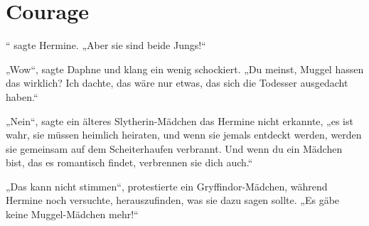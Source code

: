 \chapter{Courage}

“ sagte Hermine. „Aber sie sind beide Jungs!“

\hplettrineextrapara
„Wow“, sagte Daphne und klang ein wenig schockiert. „Du meinst, Muggel hassen das wirklich? Ich dachte, das wäre nur etwas, das sich die Todesser ausgedacht haben.“

„Nein“, sagte ein älteres Slytherin-Mädchen das Hermine nicht erkannte, „es ist wahr, sie müssen heimlich heiraten, und wenn sie jemals entdeckt werden, werden sie gemeinsam auf dem Scheiterhaufen verbrannt. Und wenn du ein Mädchen bist, das es romantisch findet, verbrennen sie dich auch.“

„Das kann nicht stimmen“, protestierte ein Gryffindor-Mädchen, während Hermine noch versuchte, herauszufinden, was sie dazu sagen sollte. „Es gäbe keine Muggel-Mädchen mehr!“


